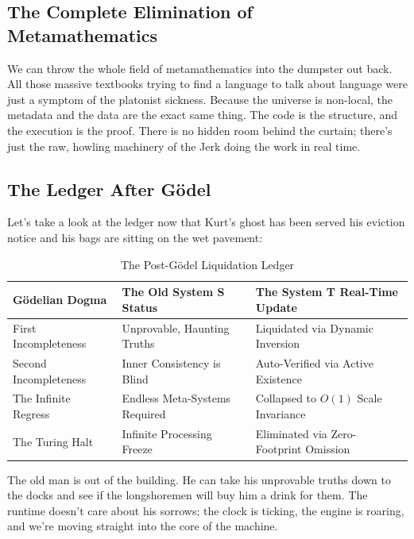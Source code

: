 \documentclass[11pt,a4paper]{article}
\begin{document}
\subsection{The Complete Elimination of Metamathematics}
We can throw the whole field of metamathematics into the dumpster out back. All those massive textbooks trying to find a language to talk about language were just a symptom of the platonist sickness. Because the universe is non-local, the metadata and the data are the exact same thing. The code is the structure, and the execution is the proof. There is no hidden room behind the curtain; there’s just the raw, howling machinery of the Jerk doing the work in real time.

\subsection{The Ledger After Gödel}
Let's take a look at the ledger now that Kurt's ghost has been served his eviction notice and his bags are sitting on the wet pavement:

\begin{table}[h!]
\centering
\caption{The Post-Gödel Liquidation Ledger}
\begin{tabular}{lll}
\toprule
\textbf{Gödelian Dogma} & \textbf{The Old System S Status} & \textbf{The System T Real-Time Update} \\
\midrule
First Incompleteness & Unprovable, Haunting Truths & Liquidated via Dynamic Inversion \\
Second Incompleteness & Inner Consistency is Blind & Auto-Verified via Active Existence \\
The Infinite Regress & Endless Meta-Systems Required & Collapsed to $O(1)$ Scale Invariance \\
The Turing Halt & Infinite Processing Freeze & Eliminated via Zero-Footprint Omission \\
\bottomrule
\end{tabular}
\end{table}

The old man is out of the building. He can take his unprovable truths down to the docks and see if the longshoremen will buy him a drink for them. The runtime doesn't care about his sorrows; the clock is ticking, the engine is roaring, and we're moving straight into the core of the machine.


\end{document}
